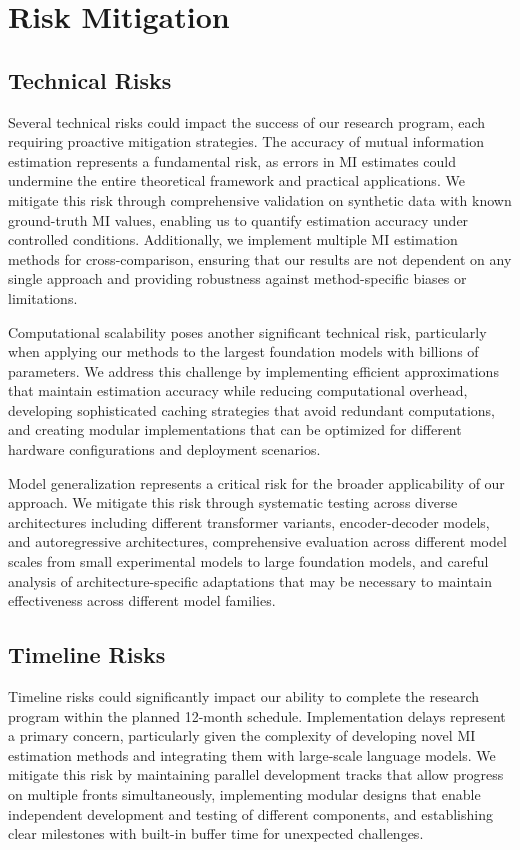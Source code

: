 \documentclass[11pt, oneside]{book}
\theoremstyle{plain}
\theoremstyle{definition}
\theoremstyle{remark}
\begin{document}
\section{Risk Mitigation}

\subsection{Technical Risks}

Several technical risks could impact the success of our research program, each requiring proactive mitigation strategies. The accuracy of mutual information estimation represents a fundamental risk, as errors in MI estimates could undermine the entire theoretical framework and practical applications. We mitigate this risk through comprehensive validation on synthetic data with known ground-truth MI values, enabling us to quantify estimation accuracy under controlled conditions. Additionally, we implement multiple MI estimation methods for cross-comparison, ensuring that our results are not dependent on any single approach and providing robustness against method-specific biases or limitations.

Computational scalability poses another significant technical risk, particularly when applying our methods to the largest foundation models with billions of parameters. We address this challenge by implementing efficient approximations that maintain estimation accuracy while reducing computational overhead, developing sophisticated caching strategies that avoid redundant computations, and creating modular implementations that can be optimized for different hardware configurations and deployment scenarios.

Model generalization represents a critical risk for the broader applicability of our approach. We mitigate this risk through systematic testing across diverse architectures including different transformer variants, encoder-decoder models, and autoregressive architectures, comprehensive evaluation across different model scales from small experimental models to large foundation models, and careful analysis of architecture-specific adaptations that may be necessary to maintain effectiveness across different model families.

\subsection{Timeline Risks}

Timeline risks could significantly impact our ability to complete the research program within the planned 12-month schedule. Implementation delays represent a primary concern, particularly given the complexity of developing novel MI estimation methods and integrating them with large-scale language models. We mitigate this risk by maintaining parallel development tracks that allow progress on multiple fronts simultaneously, implementing modular designs that enable independent development and testing of different components, and establishing clear milestones with built-in buffer time for unexpected challenges.
\end{document}
